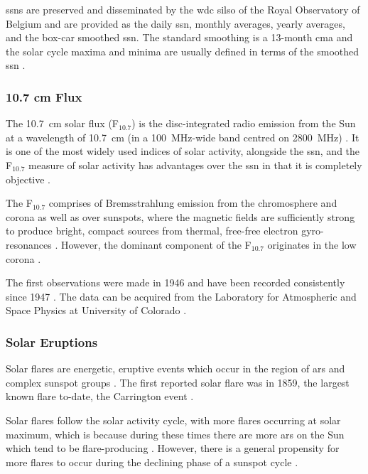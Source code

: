 \glspl{ssn} are preserved and disseminated by the \gls{wdc} \gls{silso} of the Royal Observatory of Belgium \citep{silso_world_data_center_international_2020} and are provided as the daily \gls{ssn}, monthly averages, yearly averages, and the box-car smoothed \gls{ssn}. The standard smoothing is a 13-month \gls{cma} and the solar cycle maxima and minima are usually defined in terms of the smoothed \gls{ssn} \citep{hathaway_solar_2015}.


\subsubsection*{10.7 cm Flux}

The 10.7~cm solar flux (F$_{10.7}$) is the disc-integrated radio emission from the Sun at a wavelength of 10.7~cm (in a 100~MHz-wide band centred on 2800~MHz) \citep{tapping_limits_1994,tapping_107_2013}. It is one of the most widely used indices of solar activity, alongside the \gls{ssn}, and the F$_{10.7}$ measure of solar activity has advantages over the \gls{ssn} in that it is completely objective \citep{hathaway_solar_2015}.

The F$_{10.7}$ comprises of Bremsstrahlung emission from the chromosphere and corona as well as over sunspots, where the magnetic fields are sufficiently strong to produce bright, compact sources from thermal, free-free electron gyro-resonances \citep{tapping_origin_1990, tapping_107_2013}. However, the dominant component of the F$_{10.7}$ originates in the low corona \citep{tapping_origin_1990}.%

The first observations were made in 1946 and have been recorded consistently since 1947 \citep{covington_solar_1969, tapping_107_2013}. The data can be acquired from the Laboratory for Atmospheric and Space Physics at University of Colorado \citep{lisird_solar_2019}.



\glsresetall 
{}
\subsubsection*{Solar Eruptions}
Solar flares are energetic, eruptive events which occur in the region of \glspl{ar} and complex sunspot groups \citep{hathaway_solar_2015}. The first reported solar flare was in 1859, the largest known flare to-date, the Carrington event \citep{carrington_description_1859}.

Solar flares follow the solar activity cycle, with more flares occurring at solar maximum, which is because during these times there are more \glspl{ar} on the Sun which tend to be flare-producing \citep{gopalswamy_corona_2010, hathaway_solar_2015}. However, there is a general propensity for more flares to occur during the declining phase of a sunspot cycle \citep{hathaway_solar_2015}.

